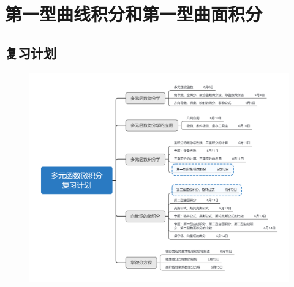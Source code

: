 \documentclass[12pt,UTF8]{ctexart}
\begin{document}
\setcounter{section}{8}
\section{第一型曲线积分和第一型曲面积分}
\noindent
\subsection{复习计划}
\begin{figure}[H]
\begin{center}
\includegraphics[height=0.5\textheight]{Figures20190612/plan.png}
\end{center}
\end{figure}
\end{document}

